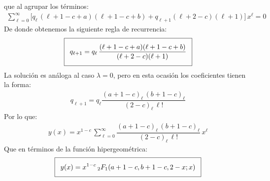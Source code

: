 que al agrupar los términos:
\begin{align*}
\sum_{\ell=0}^{\infty} \bigg[ q_{\ell} \, (\ell + 1 - c + a) (\ell + 1 - c + b) + q_{\ell+1} (\ell + 2 - c)(\ell + 1) \bigg] \, x^{\ell} = 0
\end{align*}
De donde obtenemos la siguiente regla de recurrencia:
\begin{align*}
\addtolength{\fboxsep}{5pt}\boxed{
q_{\ell + 1} = q_{\ell} \, \dfrac{(\ell + 1 - c + a) (\ell + 1 - c + b)}{(\ell + 2 - c)(\ell + 1)}}
\end{align*}
La solución es análoga al caso $\lambda = 0$, pero en esta ocasión los coeficientes tienen la forma:
\begin{align*}
q_{\ell+1} = q_{\ell} \dfrac{(a + 1 -c)_{\ell} \, (b + 1 - c)_\ell}{(2 - c)_{\ell} \, \ell!}
\end{align*}
Por lo que:
\begin{align*}
y(x) = x^{1-c} \, \sum_{\ell=0}^{\infty} \dfrac{(a + 1 -c)_{\ell} \, (b + 1 - c)_\ell}{(2 - c)_{\ell} \, \ell!} \, x^{\ell}
\end{align*}
Que en términos de la función hipergeométrica:
\begin{align*}
\addtolength{\fboxsep}{5pt}\boxed{
y(x) = x^{1-c} \, {}_{2}F_{1} (a+1-c, b+1-c, 2-x; x)}
\end{align*}
